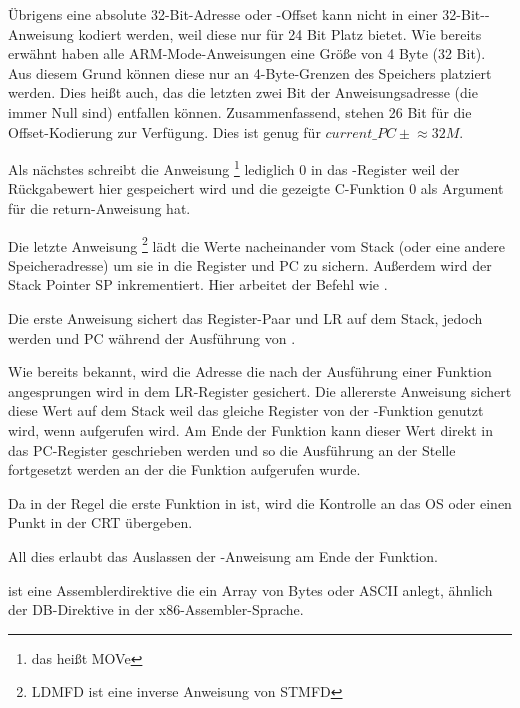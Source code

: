 Übrigens eine absolute 32-Bit-Adresse oder -Offset kann nicht in einer 32-Bit--Anweisung kodiert werden,
weil diese nur für 24 Bit Platz bietet. Wie bereits erwähnt haben alle ARM-Mode-Anweisungen eine Größe
von 4 Byte (32 Bit). Aus diesem Grund können diese nur an 4-Byte-Grenzen des Speichers platziert werden.
Dies heißt auch, das die letzten zwei Bit der Anweisungsadresse (die immer Null sind) entfallen können.
Zusammenfassend, stehen 26 Bit für die Offset-Kodierung zur Verfügung. Dies ist genug für
$current\_PC \pm{} \approx{}32M$.

Als nächstes schreibt die Anweisung \footnote{das heißt MOVe} lediglich 0 in
das -Register weil der Rückgabewert hier gespeichert wird und die gezeigte C-Funktion 0
als Argument für die return-Anweisung hat.

Die letzte Anweisung \footnote{\ac{LDMFD} ist eine inverse Anweisung von \ac{STMFD}}
lädt die Werte nacheinander vom Stack (oder eine andere Speicheradresse) um sie in die Register  und \ac{PC}
zu sichern. Außerdem wird der Stack Pointer \ac{SP} inkrementiert. Hier arbeitet der Befehl wie \POP.

Die erste Anweisung  sichert das Register-Paar  und \ac{LR} auf dem Stack, jedoch werden  und \ac{PC}
während der Ausführung von  .

Wie bereits bekannt, wird die Adresse die nach der Ausführung einer Funktion angesprungen wird in dem \ac{LR}-Register gesichert.
Die allererste Anweisung sichert diese Wert auf dem Stack weil das gleiche Register von der \main-Funktion genutzt wird,
wenn \printf aufgerufen wird.
Am Ende der Funktion kann dieser Wert direkt in das \ac{PC}-Register geschrieben werden und so die Ausführung an der
Stelle fortgesetzt werden an der die Funktion aufgerufen wurde.

Da \main in der Regel die erste Funktion in \CCpp ist, wird die Kontrolle an das \ac{OS} oder einen Punkt in der
\ac{CRT} übergeben.

All dies erlaubt das Auslassen der -Anweisung am Ende der Funktion.

 ist eine Assemblerdirektive die ein Array von Bytes oder ASCII anlegt, ähnlich der DB-Direktive
in der x86-Assembler-Sprache.

